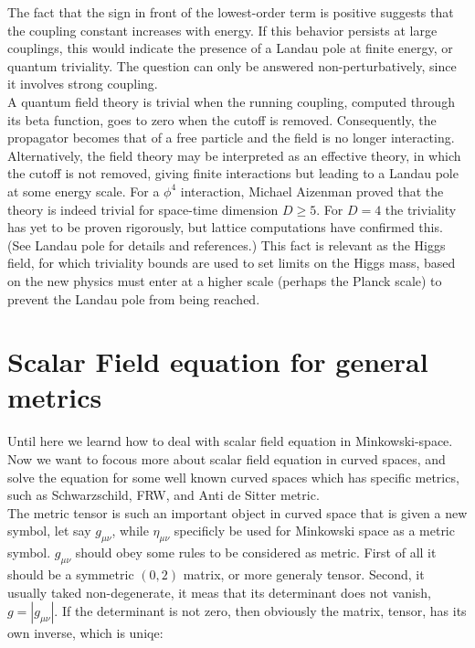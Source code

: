 The fact that the sign in front of the lowest-order term is positive suggests that the coupling constant increases with energy. If this behavior persists at large couplings, this would indicate the presence of a Landau pole at finite energy, or quantum triviality. The question can only be answered non-perturbatively, since it involves strong coupling.\\

A quantum field theory is trivial when the running coupling, computed through its beta function, goes to zero when the cutoff is removed. Consequently, the propagator becomes that of a free particle and the field is no longer interacting. Alternatively, the field theory may be interpreted as an effective theory, in which the cutoff is not removed, giving finite interactions but leading to a Landau pole at some energy scale. For a $\phi^4$ interaction, Michael Aizenman proved that the theory is indeed trivial for space-time dimension $D\ge 5$. For $D=4$ the triviality has yet to be proven rigorously, but lattice computations have confirmed this. (See Landau pole for details and references.) This fact is relevant as the Higgs field, for which triviality bounds are used to set limits on the Higgs mass, based on the new physics must enter at a higher scale (perhaps the Planck scale) to prevent the Landau pole from being reached.\\

\section{Scalar Field equation for general metrics}

Until here we learnd how to deal with scalar field equation in Minkowski-space. Now we want to focous more about scalar field equation in curved spaces, and solve the equation for some well known curved spaces which has specific metrics, such as Schwarzschild, FRW, and Anti de Sitter metric.\\

The metric tensor is such an important object in curved space that is given a new symbol, let say $g_{\mu\nu}$, while $\eta_{\mu\nu}$ specificly be used for Minkowski space as a metric symbol. $g_{\mu\nu}$ should obey some rules to be considered as metric. First of all it should be a symmetric $(0,2)$ matrix, or more generaly tensor. Second, it usually taked non-degenerate, it meas that its determinant does not vanish, $g = |g_{\mu\nu}|$. If the determinant is not zero, then obviously the matrix, tensor, has its own inverse, which is uniqe:\\

